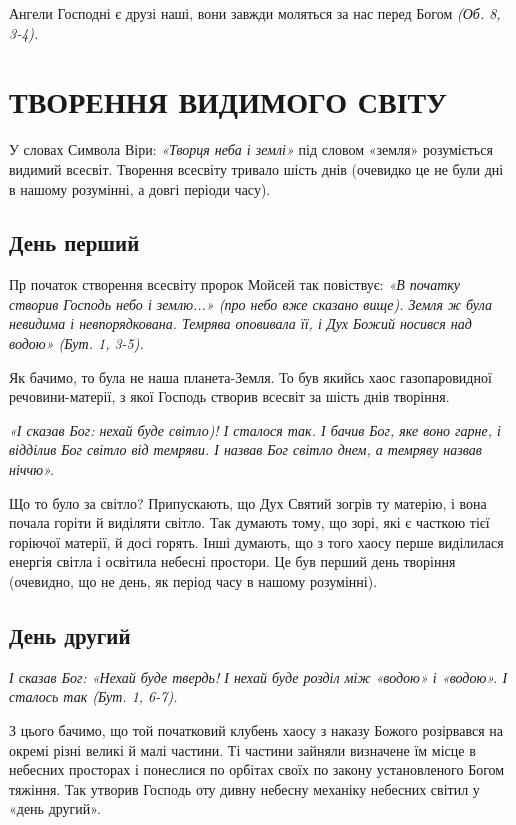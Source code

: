 \documentclass[main.tex]{subfiles}
\begin{document}
Ангели Господні є друзі наші, вони завжди моляться за нас перед Богом \emph{(Об. 8, 3-4).}

\section{ТВОРЕННЯ ВИДИМОГО СВІТУ}

У словах Символа Віри: \emph{«Творця неба і землі»} під словом «земля» розуміється видимий всесвіт. Творення всесвіту тривало шість днів (очевидко це не були дні в нашому розумінні, а довгі періоди часу).
\subsection{День перший}
Пр початок створення всесвіту пророк Мойсей так повіствує: \emph{«В початку створив Господь небо і землю...» (про небо вже сказано вище). Земля ж була невидима і невпорядкована. Темрява оповивала її, і Дух Божий носився над водою» (Бут. 1, 3-5).}

Як бачимо, то була не наша планета-Земля. То був якийсь хаос газопаровидної речовини-матерії, з якої Господь створив всесвіт за шість днів творіння.
\begin{FlushRight}
    \emph{«І сказав Бог: нехай буде світло)! І сталося так. І бачив Бог, яке воно гарне, і відділив Бог світло від темряви. І назвав Бог світло днем, а темряву назвав ніччю».}
\end{FlushRight} 

Що то було за світло? Припускають, що Дух Святий зогрів ту матерію, і вона почала горіти й виділяти світло. Так думають тому, що зорі, які є часткою тієї горіючої матерії, й досі горять. Інші думають, що з того хаосу перше виділилася енергія світла і освітила небесні простори. Це був перший день творіння (очевидно, що не день, як період часу в нашому розумінні).

\subsection{День другий}

\begin{FlushRight}
    \emph{І сказав Бог: {\color{red} «Нехай буде твердь! І нехай буде розділ між «водою» і «водою».} І сталось так (Бут. 1, 6-7).}
\end{FlushRight}

З цього бачимо, що той початковий клубень хаосу з наказу Божого розірвався на окремі різні великі й малі частини. Ті частини зайняли визначене їм місце в небесних просторах і понеслися по орбітах своїх по закону установленого Богом тяжіння. Так утворив Господь оту дивну небесну механіку небесних світил у «день другий».
\end{document}
